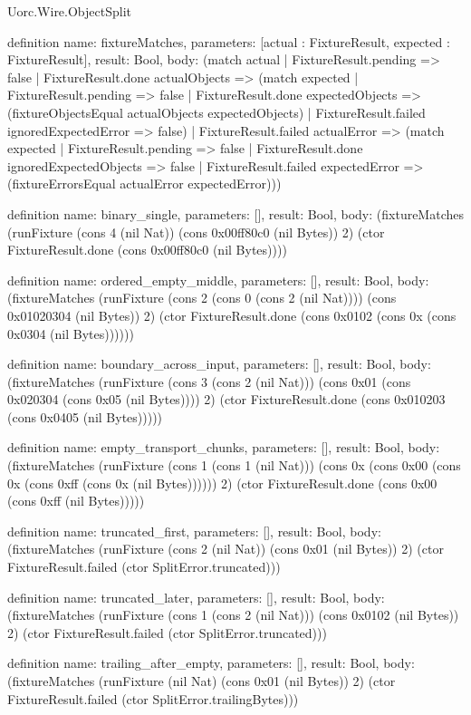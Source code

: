 \begin{lexlean}{Uorc.Wire.ObjectSplit}
\begin{semanticmodule}
definition{
  name: fixtureMatches,
  parameters: [actual : FixtureResult, expected : FixtureResult],
  result: Bool,
  body: (match actual
    | FixtureResult.pending => false
    | FixtureResult.done actualObjects => (match expected
      | FixtureResult.pending => false
      | FixtureResult.done expectedObjects => (fixtureObjectsEqual actualObjects expectedObjects)
      | FixtureResult.failed ignoredExpectedError => false)
    | FixtureResult.failed actualError => (match expected
      | FixtureResult.pending => false
      | FixtureResult.done ignoredExpectedObjects => false
      | FixtureResult.failed expectedError => (fixtureErrorsEqual actualError expectedError)))
}

definition{
  name: binary_single,
  parameters: [],
  result: Bool,
  body: (fixtureMatches (runFixture (cons 4 (nil Nat)) (cons 0x00ff80c0 (nil Bytes)) 2) (ctor FixtureResult.done (cons 0x00ff80c0 (nil Bytes))))
}

definition{
  name: ordered_empty_middle,
  parameters: [],
  result: Bool,
  body: (fixtureMatches (runFixture (cons 2 (cons 0 (cons 2 (nil Nat)))) (cons 0x01020304 (nil Bytes)) 2) (ctor FixtureResult.done (cons 0x0102 (cons 0x (cons 0x0304 (nil Bytes))))))
}

definition{
  name: boundary_across_input,
  parameters: [],
  result: Bool,
  body: (fixtureMatches (runFixture (cons 3 (cons 2 (nil Nat))) (cons 0x01 (cons 0x020304 (cons 0x05 (nil Bytes)))) 2) (ctor FixtureResult.done (cons 0x010203 (cons 0x0405 (nil Bytes)))))
}

definition{
  name: empty_transport_chunks,
  parameters: [],
  result: Bool,
  body: (fixtureMatches (runFixture (cons 1 (cons 1 (nil Nat))) (cons 0x (cons 0x00 (cons 0x (cons 0xff (cons 0x (nil Bytes)))))) 2) (ctor FixtureResult.done (cons 0x00 (cons 0xff (nil Bytes)))))
}

definition{
  name: truncated_first,
  parameters: [],
  result: Bool,
  body: (fixtureMatches (runFixture (cons 2 (nil Nat)) (cons 0x01 (nil Bytes)) 2) (ctor FixtureResult.failed (ctor SplitError.truncated)))
}

definition{
  name: truncated_later,
  parameters: [],
  result: Bool,
  body: (fixtureMatches (runFixture (cons 1 (cons 2 (nil Nat))) (cons 0x0102 (nil Bytes)) 2) (ctor FixtureResult.failed (ctor SplitError.truncated)))
}

definition{
  name: trailing_after_empty,
  parameters: [],
  result: Bool,
  body: (fixtureMatches (runFixture (nil Nat) (cons 0x01 (nil Bytes)) 2) (ctor FixtureResult.failed (ctor SplitError.trailingBytes)))
}


\end{semanticmodule}
\end{lexlean}
